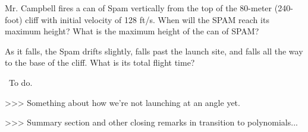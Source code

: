 %
%
%
%
%
%

\begin{boxedex}
Mr. Campbell fires a can of Spam vertically from the top of the 80-meter
(240-foot) cliff with initial velocity of 128 ft/s. When will the SPAM reach its maximum height? What is the maximum height of the can of SPAM?

As it falls, the Spam drifts slightly, falls past the launch site, and falls all the way to the base of the cliff. What is its total flight time?

\exsoln\ To do.
%
%
%
%
%
%
%
%
%
%
%
%
%
\end{boxedex}

>>> Something about how we're not launching at an angle yet.

>>> Summary section and other closing remarks in transition to polynomials...
